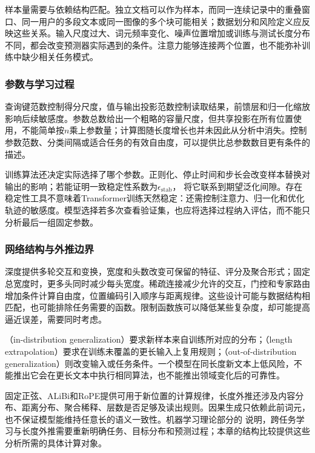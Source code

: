 样本量需要与依赖结构匹配。独立文档可以作为样本，而同一连续记录中的重叠窗口、同一用户的多段文本或同一图像的多个块可能相关；数据划分和风险定义应反映这些关系。输入尺度过大、词元频率变化、噪声位置增加或训练与测试长度分布不同，都会改变预测器实际遇到的条件。注意力能够连接两个位置，也不能弥补训练中缺少相关任务模式。

\subsubsection{参数与学习过程}

查询键范数控制得分尺度，值与输出投影范数控制读取结果，前馈层和归一化缩放影响后续敏感度。参数总数给出一个粗略的容量尺度，但共享投影在所有位置使用，不能简单按$n$乘上参数量；计算图随长度增长也并未因此从分析中消失。控制参数范数、分类间隔或适合任务的有效自由度，可以提供比总参数数目更有条件的描述。

训练算法还决定实际选择了哪个参数。正则化、停止时间和步长会改变样本替换对输出的影响；若能证明一致稳定性系数为$\epsilon_{\mathrm{stab}}$，
将它联系到期望泛化间隙。存在稳定性工具不意味着Transformer训练天然稳定：还需控制注意力、归一化和优化轨迹的敏感度。模型选择若多次查看验证集，也应将选择过程纳入评估，而不能只分析最后一组固定参数。

\subsubsection{网络结构与外推边界}

深度提供多轮交互和变换，宽度和头数改变可保留的特征、评分及聚合形式；固定总宽度时，更多头同时减少每头宽度。稀疏连接减少允许的交互，门控和专家路由增加条件计算自由度，位置编码引入顺序与距离规律。这些设计可能与数据结构相匹配，也可能排除任务需要的函数。限制函数族可以降低某些复杂度，却可能提高逼近误差，需要同时考虑。

（in-distribution generalization）要求新样本来自训练所对应的分布；（length extrapolation）要求在训练未覆盖的更长输入上复用规则；（out-of-distribution generalization）则改变输入或任务条件。一个模型在同长度新文本上低风险，不能推出它会在更长文本中执行相同算法，也不能推出领域变化后的可靠性。

固定正弦、ALiBi和RoPE提供可用于新位置的计算规律，长度外推还涉及内容分布、距离分布、聚合稀释、层数是否足够及读出规则。因果生成只依赖此前词元，也不保证模型能维持任意长的语义一致性。机器学习理论部分的
说明，跨任务学习与长度外推需要重新明确任务、目标分布和预测过程；本章的结构比较提供这些分析所需的具体计算对象。

